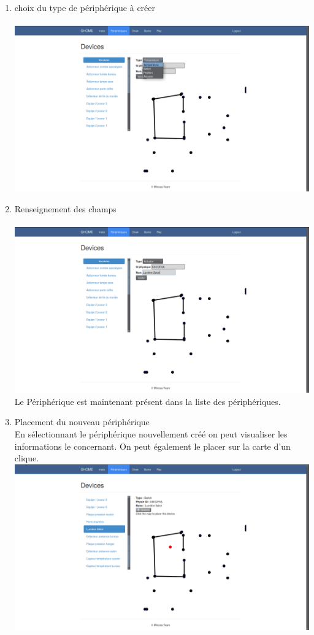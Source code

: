 \begin{enumerate}
\item choix du type de périphérique à créer\\
~~\\
\includegraphics[scale=0.25]{image/periphChoice}\\
\item Renseignement des champs \\
~~\\
\includegraphics[scale=0.25]{image/formPeriph}\\
Le Périphérique est maintenant présent dans la liste des périphériques.
\item Placement du nouveau périphérique\\
En sélectionnant le périphérique nouvellement créé on peut visualiser les informations le concernant. On peut également le placer sur la carte d'un clique.\\
\includegraphics[scale=0.25]{image/placePeriph}
\end{enumerate}
